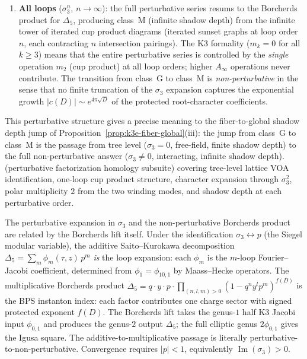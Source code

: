 \begin{enumerate}[label=(\roman*)]
\item \textbf{All loops} ($\sigma_3^n$, $n \to \infty$): the
 full perturbative series resums to the Borcherds product
 for $\Delta_5$, producing class~M (infinite shadow depth)
 from the infinite tower of iterated cup product diagrams
 (iterated sunset graphs at loop order $n$, each contracting
 $n$ intersection pairings). The K3 formality ($m_k = 0$
 for all $k \geq 3$) means that the entire perturbative
 series is controlled by the \emph{single} operation $m_2$
 (cup product) at all loop orders; higher $A_\infty$
 operations never contribute. The
 transition from class~G to class~M is \emph{non-perturbative}
 in the sense that no finite truncation of the $\sigma_3$
 expansion captures the exponential growth
 $|c(D)| \sim e^{4\pi\sqrt{D}}$ of the protected root-character
 coefficients.
\end{enumerate}

This perturbative structure gives a precise meaning to the
fiber-to-global shadow depth jump of
Proposition~\ref{prop:k3e-fiber-global}(iii): the jump from class~G
to class~M is the passage from tree level ($\sigma_3 = 0$,
free-field, finite shadow depth) to the full non-perturbative
answer ($\sigma_3 \neq 0$, interacting, infinite shadow depth).
(perturbative factorization homology subsuite) covering tree-level
lattice VOA identification, one-loop cup product structure,
character expansion through $\sigma_3^2$, polar multiplicity $2$ from
the two winding modes, and shadow depth at each perturbative order.

\begin{remark}
\label{rem:borcherds-resummation}
The perturbative expansion in $\sigma_3$ and the non-perturbative Borcherds product are related by the Borcherds lift itself. Under the identification $\sigma_3 \leftrightarrow p$ (the Siegel modular variable), the additive Saito--Kurokawa decomposition $\Delta_5 = \sum_m \phi_m(\tau, z) \, p^m$ \emph{is} the loop expansion: each $\phi_m$ is the $m$-loop Fourier--Jacobi coefficient, determined from $\phi_1 = \phi_{10,1}$ by Maass--Hecke operators. The multiplicative Borcherds product $\Delta_5 = q \cdot y \cdot p \cdot \prod_{(n,l,m) > 0}(1 - q^n y^l p^m)^{f(D)}$ is the BPS instanton index: each factor contributes one charge sector with signed protected exponent $f(D)$. The Borcherds lift takes the genus-$1$ half K3 Jacobi input $\phi_{0,1}$ and produces the genus-$2$ output $\Delta_5$; the full elliptic genus $2\phi_{0,1}$ gives the Igusa square. The additive-to-multiplicative passage is literally perturbative-to-non-perturbative. Convergence requires $|p| < 1$, equivalently $\operatorname{Im}(\sigma_3) > 0$.
\end{remark}

